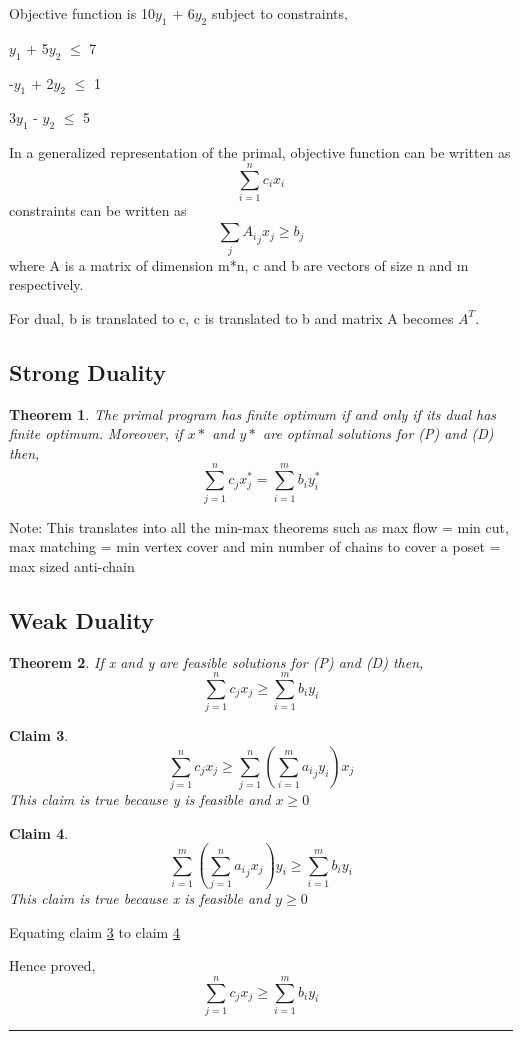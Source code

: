 \documentclass[twoside]{article}
\newcounter{lecnum}
\newtheorem{theorem}{Theorem}[lecnum]
\newtheorem{claim}[theorem]{Claim}
\newenvironment{proof}{{\bf Proof:}}{\hfill\rule{2mm}{2mm}}
\begin{document}
Objective function is 10$y_1$ + 6$y_2$ subject to constraints,

\hspace{10mm} $y_1$ + 5$y_2$ $\leq$ 7

\hspace{10mm} -$y_1$ + 2$y_2$ $\leq$ 1

\hspace{10mm} 3$y_1$ - $y_2$ $\leq$ 5

In a generalized representation of the primal, objective function can be written as 
$$\sum_{i=1}^{n} c_i x_i$$
constraints can be written as $$ \sum_{j}^{} {A_i}_j x_j \geq b_j $$
where A is a matrix of dimension m*n, c and b are vectors of size n and m respectively. 

For dual, b is translated to c, c is translated to b and matrix A becomes $A^T$.

\subsection{Strong Duality}
\begin{theorem}
The primal program has finite optimum if and only if its dual has finite optimum. Moreover, if $x*$ and $y*$ are optimal solutions for (P) and (D) then,
$$\sum_{j=1}^{n} c_j x_j^* = \sum_{i=1}^{m} b_i y_i^*$$
\end{theorem}
Note: This translates into all the min-max theorems such as max flow = min cut, max matching = min vertex cover and min number of chains to cover a poset = max sized anti-chain

\subsection{Weak Duality}
\begin{theorem}
If x and y are feasible solutions for (P) and (D) then,
$$\sum_{j=1}^{n} c_j x_j \geq \sum_{i=1}^{m} b_i y_i$$
\end{theorem}
\begin{proof}
\begin{claim}
\label{wdtc1}
$$\sum_{j=1}^{n} c_j x_j \geq \sum_{j=1}^{n} (\sum_{i=1}^{m} {a_i}_j y_i) x_j$$
This claim is true because y is feasible and $x \geq 0$
\end{claim}
\begin{claim}
\label{wdtc2}
$$\sum_{i=1}^{m} (\sum_{j=1}^{n} {a_i}_j x_j) y_i \geq \sum_{i=1}^{m} b_i y_i$$
This claim is true because x is feasible and $y \geq 0$
\end{claim}
Equating claim \ref{wdtc1} to claim \ref{wdtc2}

Hence proved, $$\sum_{j=1}^{n} c_j x_j \geq \sum_{i=1}^{m} b_i y_i$$
\end{proof}
\end{document}
